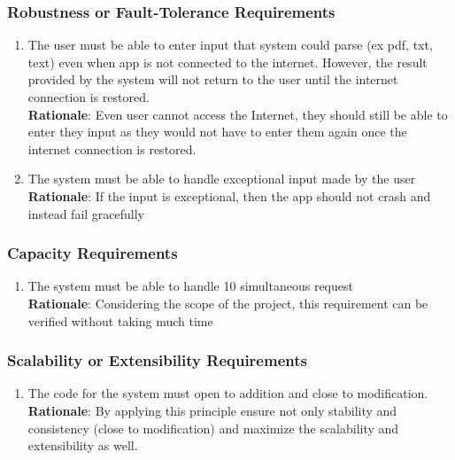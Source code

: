 \subsubsection{Robustness or Fault-Tolerance Requirements}
\label{ssub:robustness_or_fault_tolerance_requirements}
\begin{enumerate}[{PR-RFT}1. ]
	\item The user must be able to enter input that system could parse (ex pdf, txt, text) even when app is not connected to the internet. However, the result provided by the system will not return to the user until the internet connection is restored.
	\\ \textbf{Rationale}: Even user cannot access the Internet, they should still be able to enter they input as they would not have to enter them again once the internet connection is restored.
	\item The system must be able to handle exceptional input made by the user
	\\ \textbf{Rationale}: If the input is exceptional, then the app should not crash and instead fail gracefully
\end{enumerate}

\subsubsection{Capacity Requirements}
\label{ssub:capacity_requirements}
\begin{enumerate}[{PR-C}1. ]
	\item The system must be able to handle 10 simultaneous request
	\\ \textbf{Rationale}: Considering the scope of the project, this requirement can be verified without taking much time	
\end{enumerate}

\subsubsection{Scalability or Extensibility Requirements}
\label{ssub:scalability_or_extensibility_requirements}
\begin{enumerate}[{PR-SE}1. ]
	\item The code for the system must open to addition and close to modification.
	\\ \textbf{Rationale}: By applying this principle ensure not only stability and consistency (close to modification) and maximize 	the scalability and extensibility as well.
\end{enumerate}

